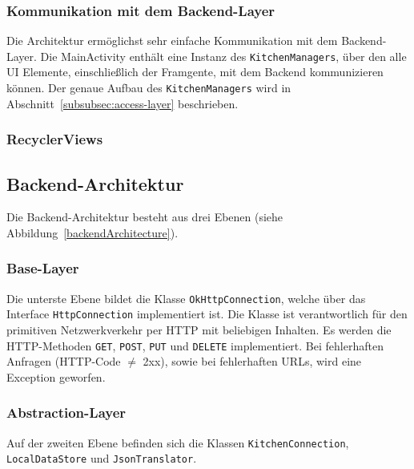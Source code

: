 \subsubsection{Kommunikation mit dem Backend-Layer}

Die Architektur ermöglichst sehr einfache Kommunikation mit dem Backend-Layer.
Die MainActivity enthält eine Instanz des \texttt{KitchenManagers}, über den alle UI Elemente, einschließlich der Framgente, mit dem Backend kommunizieren können.
Der genaue Aufbau des \texttt{KitchenManagers} wird in Abschnitt~\ref{subsubsec:access-layer} beschrieben.

\subsubsection{RecyclerViews}

\subsection{Backend-Architektur}\label{subsec:backend}

Die Backend-Architektur besteht aus drei Ebenen (siehe Abbildung~\ref{backendArchitecture}).

\subsubsection{Base-Layer}

Die unterste Ebene bildet die Klasse \texttt{OkHttpConnection}, welche über das Interface \texttt{HttpConnection} implementiert ist.
Die Klasse ist verantwortlich für den primitiven Netzwerkverkehr per HTTP mit beliebigen Inhalten.
Es werden die HTTP-Methoden \texttt{GET}, \texttt{POST}, \texttt{PUT} und \texttt{DELETE} implementiert.
Bei fehlerhaften Anfragen (HTTP-Code $\neq$ 2xx), sowie bei fehlerhaften URLs, wird eine Exception geworfen.

\subsubsection{Abstraction-Layer}

Auf der zweiten Ebene befinden sich die Klassen \texttt{KitchenConnection}, \texttt{LocalDataStore} und \texttt{JsonTranslator}.

